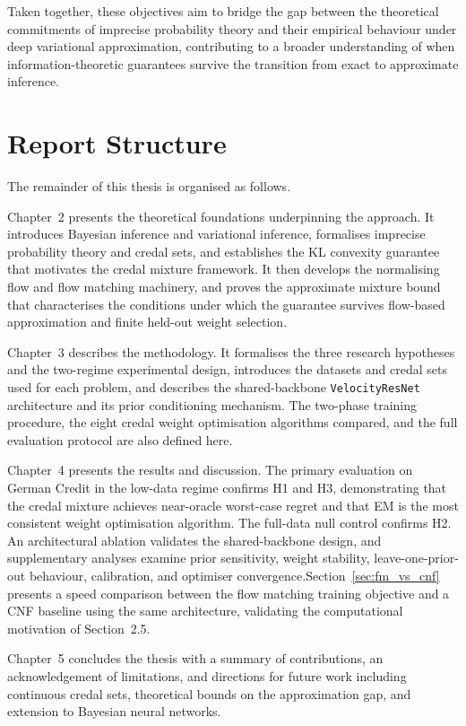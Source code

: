 Taken together, these objectives aim to bridge the gap between the 
theoretical commitments of imprecise probability theory and their 
empirical behaviour under deep variational approximation, contributing 
to a broader understanding of when information-theoretic guarantees 
survive the transition from exact to approximate inference.

\section{Report Structure}

The remainder of this thesis is organised as follows.

Chapter~2 presents the theoretical foundations 
underpinning the approach. It introduces Bayesian 
inference and variational inference, formalises 
imprecise probability theory and credal sets, and 
establishes the KL convexity guarantee that motivates 
the credal mixture framework. It then develops the 
normalising flow and flow matching machinery, and 
proves the approximate mixture bound that characterises 
the conditions under which the guarantee survives 
flow-based approximation and finite held-out weight 
selection.

Chapter~3 describes the methodology. It formalises 
the three research hypotheses and the two-regime 
experimental design, introduces the datasets and 
credal sets used for each problem, and describes the 
shared-backbone \texttt{VelocityResNet} architecture 
and its prior conditioning mechanism. The two-phase 
training procedure, the eight credal weight 
optimisation algorithms compared, and the full 
evaluation protocol are also defined here.

Chapter~4 presents the results and discussion. 
The primary evaluation on German Credit in the 
low-data regime confirms H1 and H3, demonstrating 
that the credal mixture achieves near-oracle 
worst-case regret and that EM is the most consistent 
weight optimisation algorithm. The full-data null 
control confirms H2. An architectural ablation 
validates the shared-backbone design, and 
supplementary analyses examine prior sensitivity, 
weight stability, leave-one-prior-out behaviour, 
calibration, and optimiser convergence.Section~\ref{sec:fm_vs_cnf} presents a 
speed comparison between the flow matching 
training objective and a CNF baseline using 
the same architecture, validating the 
computational motivation of Section~2.5.

Chapter~5 concludes the thesis with a summary of 
contributions, an acknowledgement of limitations, 
and directions for future work including continuous 
credal sets, theoretical bounds on the approximation 
gap, and extension to Bayesian neural networks.